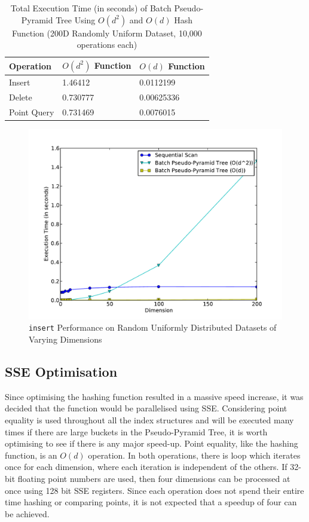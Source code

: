 \begin{table}
	\centering
	\begin{tabular}{|l|l|l|}
		\hline
		\textbf{Operation} & \textbf{$O(d^2)$ Function} & \textbf{$O(d)$ Function} \\
		\hline
		Insert & 1.46412 & 0.0112199 \\
		Delete & 0.730777 & 0.00625336 \\
		Point Query & 0.731469 & 0.0076015 \\
		\hline
	\end{tabular}
	\caption{Total Execution Time (in seconds) of Batch Pseudo-Pyramid Tree Using $O(d^2)$ and $O(d)$ Hash Function (200D Randomly Uniform Dataset, 10,000 operations each)}
	\label{tab:new-pseudo-pyramid-hash}
\end{table}

\begin{figure}
	\centering
	\includegraphics[scale=0.5]{figures/performance_analysis/iteration_1/new_pseudo-pyramid_hash_performance.pdf}
	\caption{\texttt{insert} Performance on Random Uniformly Distributed Datasets of Varying Dimensions}
	\label{fig:new-pseudo-pyramid-hash}
\end{figure}

\subsection{SSE Optimisation}

Since optimising the hashing function resulted in a massive speed increase, it was decided that the function would be parallelised using SSE. Considering point equality is used throughout all the index structures and will be executed many times if there are large buckets in the Pseudo-Pyramid Tree, it is worth optimising to see if there is any major speed-up. Point equality, like the hashing function, is an $O(d)$ operation. In both operations, there is loop which iterates once for each dimension, where each iteration is independent of the others. If 32-bit floating point numbers are used, then four dimensions can be processed at once using 128 bit SSE registers. Since each operation does not spend their entire time hashing or comparing points, it is not expected that a speedup of four can be achieved.

